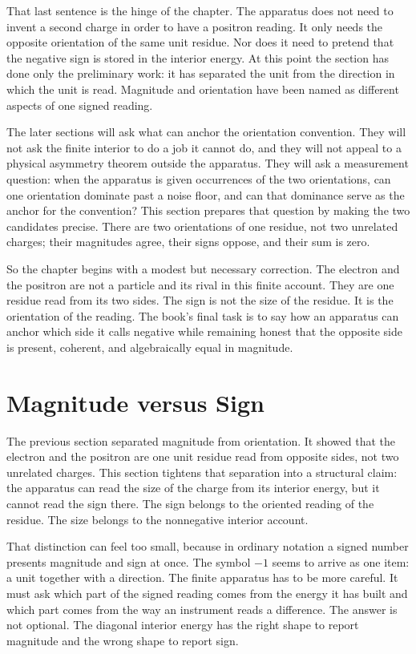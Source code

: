 That last sentence is the hinge of the chapter. The apparatus does not need to
invent a second charge in order to have a positron reading. It only needs the
opposite orientation of the same unit residue. Nor does it need to pretend that
the negative sign is stored in the interior energy. At this point the section
has done only the preliminary work: it has separated the unit from the direction
in which the unit is read. Magnitude and orientation have been named as
different aspects of one signed reading.

The later sections will ask what can anchor the orientation convention. They
will not ask the finite interior to do a job it cannot do, and they will not
appeal to a physical asymmetry theorem outside the apparatus. They will ask a
measurement question: when the apparatus is given occurrences of the two
orientations, can one orientation dominate past a noise floor, and can that
dominance serve as the anchor for the convention? This section prepares that
question by making the two candidates precise. There are two orientations of
one residue, not two unrelated charges; their magnitudes agree, their signs
oppose, and their sum is zero.

So the chapter begins with a modest but necessary correction. The electron and
the positron are not a particle and its rival in this finite account. They are
one residue read from its two sides. The sign is not the size of the residue.
It is the orientation of the reading. The book's final task is to say how an
apparatus can anchor which side it calls negative while remaining honest that
the opposite side is present, coherent, and algebraically equal in magnitude.

\section{Magnitude versus Sign}

The previous section separated magnitude from orientation. It showed that the
electron and the positron are one unit residue read from opposite sides, not two
unrelated charges. This section tightens that separation into a structural
claim: the apparatus can read the size of the charge from its interior energy,
but it cannot read the sign there. The sign belongs to the oriented reading of
the residue. The size belongs to the nonnegative interior account.

That distinction can feel too small, because in ordinary notation a signed
number presents magnitude and sign at once. The symbol \(-1\) seems to arrive as
one item: a unit together with a direction. The finite apparatus has to be more
careful. It must ask which part of the signed reading comes from the energy it
has built and which part comes from the way an instrument reads a difference.
The answer is not optional. The diagonal interior energy has the right shape to
report magnitude and the wrong shape to report sign.

